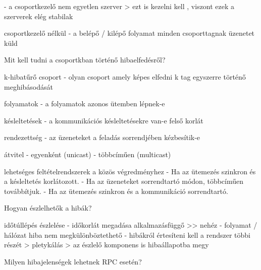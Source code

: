 \documentclass[12pt]{article}
\begin{document}
\begin{description}
                                        - a csoportkezelő nem egyetlen szerver
                                        > ezt is kezelni kell , viszont ezek a szerverek elég stabilak
                                    \item csoportkezelő nélkül
                                        - a belépő / kilépő folyamat minden csoporttagnak üzenetet küld
                                    \item  Mit kell tudni a csoportkban történő hibaelfedésről?
                                    \item k-hibatűrő csoport
                                        - olyan csoport amely képes elfedni k tag egyszerre történő meghibásodását
                                    \item folyamatok
                                        - a folyamatok azonos ütemben lépnek-e
                                    \item késleltetések
                                        - a kommunikációs késleltetésekre van-e felső korlát
                                    \item rendezettség
                                        - az üzeneteket a feladás sorrendjében kézbesítik-e
                                    \item átvitel
                                        - egyenként (unicast)
                                        - többcíműen (multicast)
                                    \item lehetséges feltételrendszerek a közös végredményhez 
                                        - Ha az ütemezés szinkron és a késleltetés korlátozott.
                                        - Ha az üzeneteket sorrendtartó módon, többcíműen továbbítjuk.
                                        - Ha az ütemezés szinkron és a kommunikáció sorrendtartó.
                                    \item  Hogyan észlelhetők a hibák?
                                    \item időtúllépés észlelése
                                        - időkorlát megadása alkalmazásfüggő >> nehéz
                                        - folyamat / hálózat hiba nem megkülönböztethető
                                        - hibákról értesíteni kell a rendszer többi részét
                                        > pletykálás
                                        > az észlelő komponens is hibaállapotba megy
                                    \item  Milyen hibajelenségek lehetnek RPC esetén?

\end{description}
\end{document}

